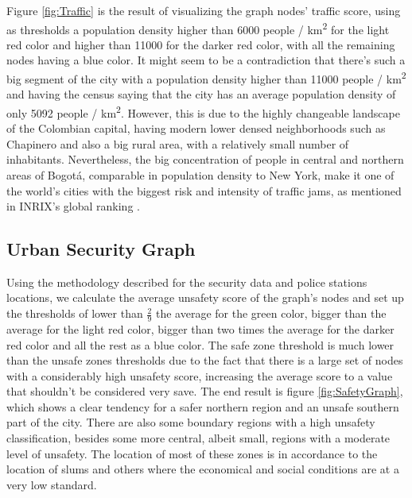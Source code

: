 \documentclass[runningheads]{llncs}
\begin{document}
Figure \ref{fig:Traffic} is the result of visualizing the graph nodes' traffic score, using as thresholds a population density higher than 6000 people / km\textsuperscript{2} for the light red color and higher than 11000 for the darker red color, with all the remaining nodes having a blue color. It might seem to be a contradiction that there's such a big segment of the city with a population density higher than 11000 people / km\textsuperscript{2} and having the census saying that the city has an average population density of only 5092 people / km\textsuperscript{2}. However, this is due to the highly changeable landscape of the Colombian capital, having modern lower densed neighborhoods such as Chapinero and also a big rural area, with a relatively small number of inhabitants. Nevertheless, the big concentration of people in central and northern areas of Bogotá, comparable in population density to New York, make it one of the world's cities with the biggest risk and intensity of traffic jams, as mentioned in INRIX's global ranking \cite{noauthor_inrix_2017}.


\subsection{Urban Security Graph}

Using the methodology described for the security data and police stations locations, we calculate the average unsafety score of the graph's nodes and set up the thresholds of lower than $\frac{2}{9}$ the average for the green color, bigger than the average for the light red color, bigger than two times the average for the darker red color and all the rest as a blue color. The safe zone threshold is much lower than the unsafe zones thresholds due to the fact that there is a large set of nodes with a considerably high unsafety score, increasing the average score to a value that shouldn't be considered very save. The end result is figure \ref{fig:SafetyGraph}, which shows a clear tendency for a safer northern region and an unsafe southern part of the city. There are also some boundary regions with a high unsafety classification, besides some more central, albeit small, regions with a moderate level of unsafety. The location of most of these zones is in accordance to the location of slums \cite{rueda-garcia_case_2003} and others where the economical and social conditions are at a very low standard.
\end{document}
